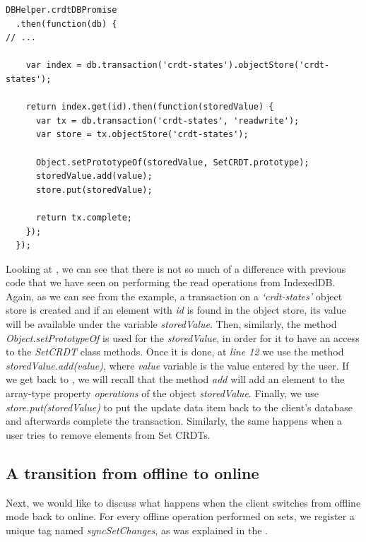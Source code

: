 \begin{lstlisting}[caption={[Applying operation \textit{add} on a Set CRDT while offline]Performing an operation \textit{add} on a Set CRDT while the client is offline.}, label={lst:dev11}]
DBHelper.crdtDBPromise
  .then(function(db) {
// ...

    var index = db.transaction('crdt-states').objectStore('crdt-states');

    return index.get(id).then(function(storedValue) {
      var tx = db.transaction('crdt-states', 'readwrite');
      var store = tx.objectStore('crdt-states');

      Object.setPrototypeOf(storedValue, SetCRDT.prototype);
      storedValue.add(value);
      store.put(storedValue);

      return tx.complete;
    });
  });
\end{lstlisting}

Looking at , we can see that there is not so much of a difference with previous code that we have seen on performing the read operations from IndexedDB. Again, as we can see from the example, a transaction on a \textit{`crdt-states'} object store is created and if an element with \textit{id} is found in the object store, its value will be available under the variable \textit{storedValue}. Then, similarly, the method \textit{Object.setPrototypeOf} is used for the \textit{storedValue}, in order for it to have an access to the \textit{SetCRDT} class methods. Once it is done, at \textit{line 12} we use the method \textit{storedValue.add(value)}, where \textit{value} variable is the value entered by the user. If we get back to , we will recall that the method \textit{add} will add an element to the array-type property \textit{operations} of the object \textit{storedValue}. Finally, we use \textit{store.put(storedValue)} to put the update data item back to the client's database and afterwards complete the transaction. Similarly, the same happens when a user tries to remove elements from Set CRDTs.

\subsection*{A transition from offline to online}

Next, we would like to discuss what happens when the client switches from offline mode back to online. For every offline operation performed on sets, we register a unique tag named \textit{syncSetChanges}, as was explained in the .

